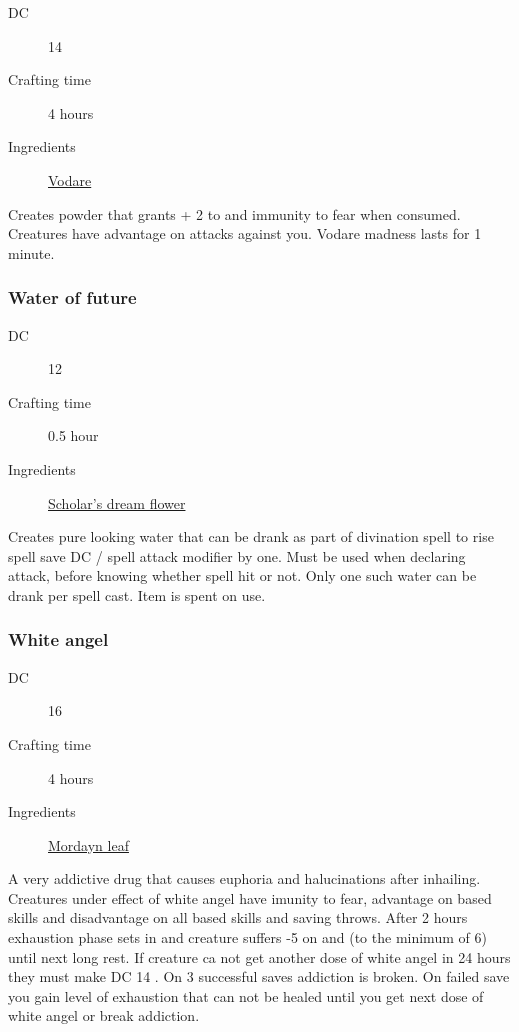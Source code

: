 \begin{description}
\item [DC] 14 \survival
\item [Crafting time] 4 hours
\item [Ingredients] \hyperref[Vodare]{Vodare}
\end{description}

Creates powder that grants + 2 to \intimidation and immunity to fear when consumed. 
Creatures have advantage on attacks against you. Vodare madness lasts for 1 minute.

\subsubsection{Water of future}
\label{Water of future}

\begin{description}
\item [DC] 12 \arcana
\item [Crafting time] 0.5 hour
\item [Ingredients] \hyperref[Scholar's dream]{Scholar's dream flower}
\end{description}

Creates pure looking water that can be drank as part of divination spell to rise  spell save DC / spell attack modifier by one. Must be used when declaring attack, before knowing whether spell hit or not. Only one such water can be drank per spell cast. Item is spent on use.

\subsubsection{White angel}
\label{White angel}

\begin{description}
\item [DC] 16 \nature
\item [Crafting time] 4 hours
\item [Ingredients] \hyperref[Mordayn]{Mordayn leaf}
\end{description}

A very addictive drug that causes euphoria and halucinations after inhailing. 
Creatures under effect of white angel have imunity to fear, advantage on \charisma{} based skills and disadvantage
 on all \intelligence{} based skills and saving throws. 
 After 2 hours exhaustion phase sets in and creature suffers -5 on \dexterity{} and \strength{} (to the minimum of 6) 
 until next long rest. If creature ca not get another dose of white angel in 24 hours they must make 
 DC 14 \constitutionsave. On 3 successful saves addiction is broken. 
 On failed save you gain level of exhaustion that can not be healed until you get next dose of white angel or break addiction.

